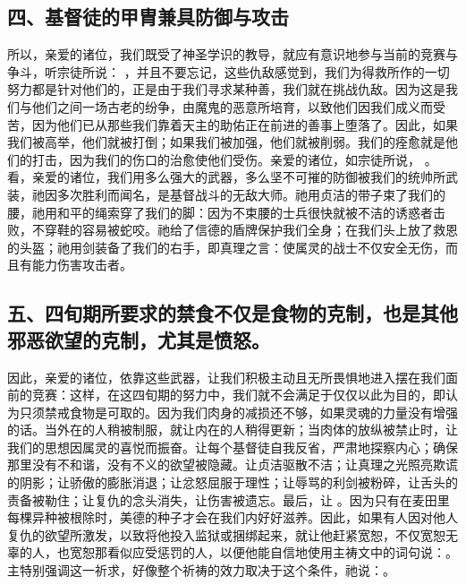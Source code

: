 
\subsection{四、基督徒的甲胄兼具防御与攻击}

所以，亲爱的诸位，我们既受了神圣学识的教导，就应有意识地参与当前的竞赛与争斗，听宗徒所说： ，并且不要忘记，这些仇敌感觉到，我们为得救所作的一切努力都是针对他们的，正是由于我们寻求某种善，我们就在挑战仇敌。因为这是我们与他们之间一场古老的纷争，由魔鬼的恶意所培育，以致他们因我们成义而受苦，因为他们已从那些我们靠着天主的助佑正在前进的善事上堕落了。因此，如果我们被高举，他们就被打倒；如果我们被加强，他们就被削弱。我们的痊愈就是他们的打击，因为我们的伤口的治愈使他们受伤。亲爱的诸位，如宗徒所说， 。看，亲爱的诸位，我们用多么强大的武器，多么坚不可摧的防御被我们的统帅所武装，祂因多次胜利而闻名，是基督战斗的无敌大师。祂用贞洁的带子束了我们的腰，祂用和平的绳索穿了我们的脚：因为不束腰的士兵很快就被不洁的诱惑者击败，不穿鞋的容易被蛇咬。祂给了信德的盾牌保护我们全身；在我们头上放了救恩的头盔；祂用剑装备了我们的右手，即真理之言：使属灵的战士不仅安全无伤，而且有能力伤害攻击者。\par


\subsection{五、四旬期所要求的禁食不仅是食物的克制，也是其他邪恶欲望的克制，尤其是愤怒。}

因此，亲爱的诸位，依靠这些武器，让我们积极主动且无所畏惧地进入摆在我们面前的竞赛：这样，在这四旬期的努力中，我们就不会满足于仅仅以此为目的，即认为只须禁戒食物是可取的。因为我们肉身的减损还不够，如果灵魂的力量没有增强的话。当外在的人稍被制服，就让内在的人稍得更新；当肉体的放纵被禁止时，让我们的思想因属灵的喜悦而振奋。让每个基督徒自我反省，严肃地探察内心；确保那里没有不和谐，没有不义的欲望被隐藏。让贞洁驱散不洁；让真理之光照亮欺谎的阴影；让骄傲的膨胀消退；让忿怒屈服于理性；让辱骂的利剑被粉碎，让舌头的责备被勒住；让复仇的念头消失，让伤害被遗忘。最后，让 。因为只有在麦田里每棵异种被根除时，美德的种子才会在我们内好好滋养。因此，如果有人因对他人复仇的欲望所激发，以致将他投入监狱或捆绑起来，就让他赶紧宽恕，不仅宽恕无辜的人，也宽恕那看似应受惩罚的人，以便他能自信地使用主祷文中的词句说：。主特别强调这一祈求，好像整个祈祷的效力取决于这个条件，祂说：。\par

